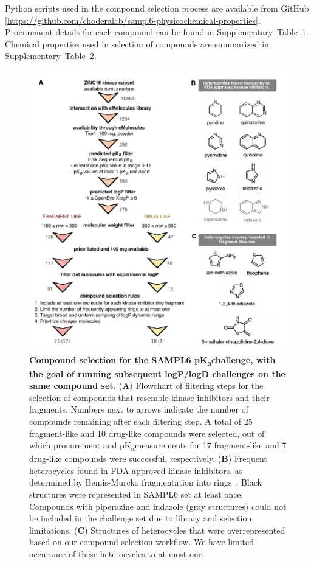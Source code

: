 \documentclass[9pt,lineno]{elife}
\newcommand{\pKa}{pK\textsubscript{a}}
\begin{document}
Python scripts used in the compound selection process are available from GitHub [\url{https://github.com/choderalab/sampl6-physicochemical-properties}]. Procurement details for each compound can be found in Supplementary~Table~1. Chemical properties used in selection of compounds are summarized in Supplementary~Table~2.

\begin{figure}
\begin{center}
\includegraphics[width=0.95\linewidth]{figures/compound_selection_figure.pdf}
\caption{{\bf Compound selection for the SAMPL6 \pKa challenge, with the goal of running subsequent logP/logD challenges on the same compound set.} 
(\textbf{A}) Flowchart of filtering steps for the selection of compounds that resemble kinase inhibitors and their fragments. 
Numbers next to arrows indicate the number of compounds remaining after each filtering step. 
A total of 25 fragment-like and 10 drug-like compounds were selected, out of which procurement and \pKa measurements for 17 fragment-like and 7 drug-like compounds were successful, respectively. 
(\textbf{B}) Frequent heterocycles found in FDA approved kinase inhibitors, as determined by Bemis-Murcko fragmentation into rings~\citep{bemis_properties_1996}. 
Black structures were represented in SAMPL6 set at least once. 
Compounds with piperazine and indazole (gray structures) could not be included in the challenge set due to library and selection limitations.  
(\textbf{C}) Structures of heterocycles that were overrepresented based on our compound selection workflow. We have limited occurance of these heterocycles to at most one.
}
\label{fig:compound_selection_figure}
\end{center}
\end{figure}
\end{document}
